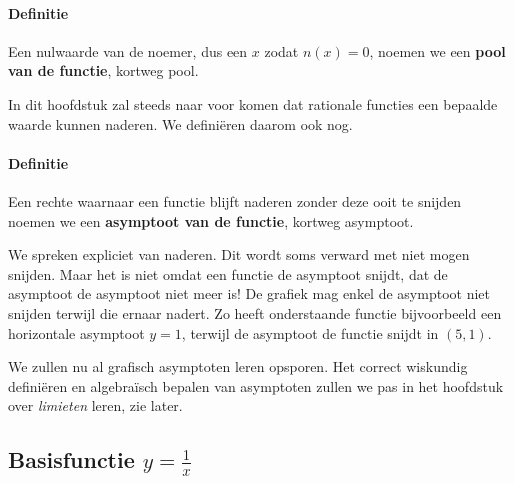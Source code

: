 \documentclass[12pt,twoside,a4paper]{article}
\begin{document}
\paragraph*{Definitie}
\begin{mdframed}
Een nulwaarde van de noemer, dus een $x$ zodat $n(x)=0$, noemen we een {\bf pool van de functie}, kortweg pool.
\end{mdframed}


In dit hoofdstuk zal steeds naar voor komen dat rationale functies een bepaalde waarde kunnen naderen. We definiëren daarom ook nog.

\paragraph*{Definitie}
\begin{mdframed}
Een rechte waarnaar een functie blijft naderen zonder deze ooit te snijden noemen we een {\bf asymptoot van de functie}, kortweg asymptoot.
\end{mdframed}

We spreken expliciet van naderen. Dit wordt soms verward met niet mogen snijden. Maar het is niet omdat een functie de asymptoot snijdt, dat de asymptoot de asymptoot niet meer is! De grafiek mag enkel de asymptoot niet snijden terwijl die ernaar nadert. Zo heeft onderstaande functie bijvoorbeeld een horizontale asymptoot $y=1$, terwijl de asymptoot de functie snijdt in $(5,1)$.

\begin{center}
\end{center}

We zullen nu al grafisch asymptoten leren opsporen. Het correct wiskundig definiëren en algebraïsch bepalen van asymptoten zullen we pas in het hoofdstuk over {\em limieten} leren, zie later.

\subsection{Basisfunctie $y=\frac{1}{x}$}
\end{document}
